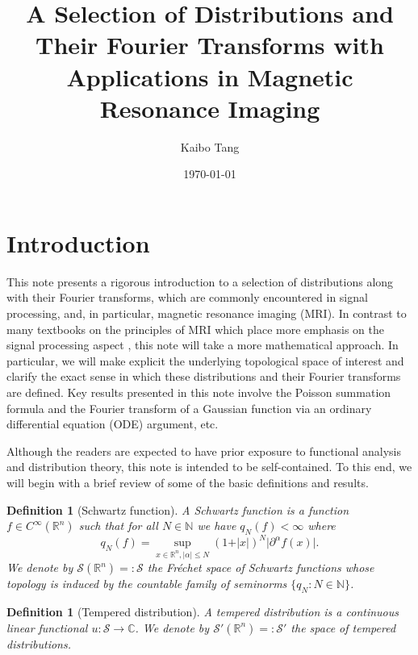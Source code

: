 \documentclass[12pt, letterpaper]{article}
\title{A Selection of Distributions and Their Fourier Transforms with Applications in Magnetic Resonance Imaging}
\author{Kaibo Tang}
\date{\today}
\theoremstyle{plain}
\newtheorem{definition}[theorem]{Definition}
\begin{document}
\maketitle

\section{Introduction}

This note presents a rigorous introduction to a selection of distributions along with their Fourier transforms, which are commonly encountered in signal processing, and, in particular, magnetic resonance imaging (MRI). In contrast to many textbooks on the principles of MRI which place more emphasis on the signal processing aspect \cite{liang_principles_2000,nishimura_principles_2010}, this note will take a more mathematical approach. In particular, we will make explicit the underlying topological space of interest and clarify the exact sense in which these distributions and their Fourier transforms are defined. Key results presented in this note involve the Poisson summation formula and the Fourier transform of a Gaussian function via an ordinary differential equation (ODE) argument, etc.

Although the readers are expected to have prior exposure to functional analysis \cite{rudin_functional_2007} and distribution theory, this note is intended to be self-contained. To this end, we will begin with a brief review of some of the basic definitions and results.

\begin{definition}[Schwartz function]
    A Schwartz function is a function $f \in C^\infty(\mathbb{R}^n)$ such that for all $N \in \mathbb{N}$ we have $q_N(f) < \infty$ where
    \begin{equation}
        q_N(f) = \sup_{x \in \mathbb{R}^n, \vert\alpha\vert \le N} (1 + \vert x\vert)^N \vert\partial^\alpha f(x)\vert.
    \end{equation}
    We denote by $\mathcal{S}(\mathbb{R}^n) =: \mathcal{S}$ the Fr\'echet space of Schwartz functions whose topology is induced by the countable family of seminorms $\{q_N: N \in \mathbb{N}\}$.
\end{definition}

\begin{definition}[Tempered distribution]
    A tempered distribution is a continuous linear functional $u: \mathcal{S} \to \mathbb{C}$. We denote by $\mathcal{S}'(\mathbb{R}^n) =: \mathcal{S}'$ the space of tempered distributions.
\end{definition}
\end{document}
